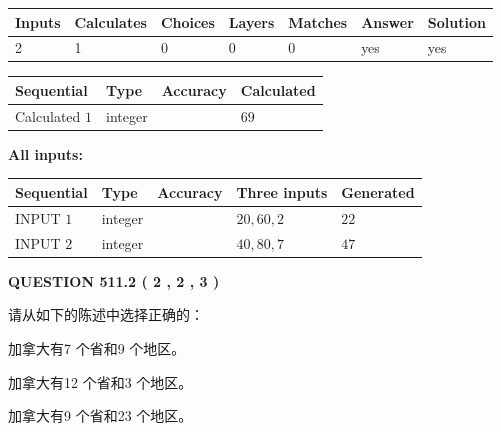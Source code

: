 \documentclass{ctexart}
\begin{document}
   
\noindent\begin{tabular}{|l|l|l|l|l|l|l|}
 \hline
Inputs & Calculates & Choices & Layers & Matches & Answer & Solution \\ \hline
 2  & 
 1  & 
 0
  & 
 0  & 
 0  & 
  yes & 
  yes 
  \\ \hline
 \end{tabular}
   
   
   
   
\noindent{}
   
   
  
  
\noindent\begin{tabular}{|l|l|l|l|}
\hline
 Sequential & Type & Accuracy & Calculated \\ 
\hline
 
 
  Calculated $  1 $ & integer &  & 
  $ 69 $ 
 \\  \hline  
 \end{tabular}
   
   
   
   
\noindent\vspace{0.1in}\hspace{-0.08in} {\textbf{\Large{All inputs: }}}
   
   
  
  
\noindent\begin{tabular}{|l|l|l|l|l|}
\hline
 Sequential & Type & Accuracy & Three inputs & Generated \\ 
\hline
 
 
  INPUT $  1 $ & integer &  & $
 20
 , 
 60
 , 
 2
 $ & $ 22 $ 
 \\  \hline  
 
 
  INPUT $  2 $ & integer &  & $
 40
 , 
 80
 , 
 7
 $ & $ 47 $ 
 \\  \hline  
 \end{tabular}
   
   
  
\vspace{0.2in}
  
{\textbf{\Large{QUESTION
511.2 
 ( 2 , 2 , 3 )
}}}
  
  
请从如下的陈述中选择正确的：
 
 
加拿大有7 个省和9 个地区。
 
 
加拿大有12 个省和3 个地区。
 
 
加拿大有9 个省和23 个地区。
 
\end{document}
